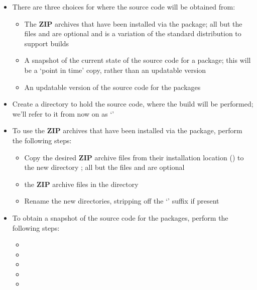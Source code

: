\begin{itemize}
\item There are three choices for where the source code will be obtained from:
\begin{itemize}
\item The \textbf{ZIP} archives that have been installed via the 
package;
all but the files  and
 are optional and 
is a variation of the standard \textbf{\yarp} distribution to support \ios{} builds
\item\exSp{}A snapshot of the current state of the source code for a package; this will be
a `point in time' copy, rather than an updatable version
\item\exSp{}An updatable version of the source code for the packages
\end{itemize}
\item\exSp{}Create a directory to hold the source code, where the build will be performed;
we'll refer to it from now on as `'
\item\exSp{}To use the \textbf{ZIP} archives that have been installed via the
 package, perform the following steps:
\begin{itemize}
\item Copy the desired \textbf{ZIP} archive files from their installation location
() to the new directory ; all but the files
 and  are optional
\item\exSp{} the \textbf{ZIP} archive files in the directory
\item\exSp{}Rename the new directories, stripping off the `' suffix if
present
\end{itemize}
\item\exSp{}To obtain a snapshot of the source code for the packages, perform the
following steps:
\begin{itemize}
\item {}
\item\exSp{}
\item\exSp{}
\item\exSp{}
\item\exSp{}

\end{itemize}
\end{itemize}
